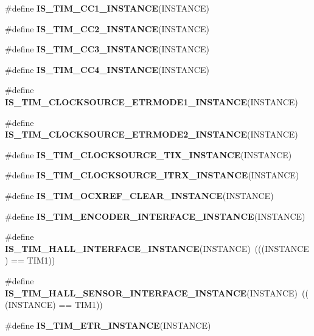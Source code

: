 \begin{DoxyCompactItemize}
\#define {\bfseries I\+S\+\_\+\+T\+I\+M\+\_\+\+C\+C1\+\_\+\+I\+N\+S\+T\+A\+N\+CE}(I\+N\+S\+T\+A\+N\+CE)
\item 
\#define {\bfseries I\+S\+\_\+\+T\+I\+M\+\_\+\+C\+C2\+\_\+\+I\+N\+S\+T\+A\+N\+CE}(I\+N\+S\+T\+A\+N\+CE)
\item 
\#define {\bfseries I\+S\+\_\+\+T\+I\+M\+\_\+\+C\+C3\+\_\+\+I\+N\+S\+T\+A\+N\+CE}(I\+N\+S\+T\+A\+N\+CE)
\item 
\#define {\bfseries I\+S\+\_\+\+T\+I\+M\+\_\+\+C\+C4\+\_\+\+I\+N\+S\+T\+A\+N\+CE}(I\+N\+S\+T\+A\+N\+CE)
\item 
\#define {\bfseries I\+S\+\_\+\+T\+I\+M\+\_\+\+C\+L\+O\+C\+K\+S\+O\+U\+R\+C\+E\+\_\+\+E\+T\+R\+M\+O\+D\+E1\+\_\+\+I\+N\+S\+T\+A\+N\+CE}(I\+N\+S\+T\+A\+N\+CE)
\item 
\#define {\bfseries I\+S\+\_\+\+T\+I\+M\+\_\+\+C\+L\+O\+C\+K\+S\+O\+U\+R\+C\+E\+\_\+\+E\+T\+R\+M\+O\+D\+E2\+\_\+\+I\+N\+S\+T\+A\+N\+CE}(I\+N\+S\+T\+A\+N\+CE)
\item 
\#define {\bfseries I\+S\+\_\+\+T\+I\+M\+\_\+\+C\+L\+O\+C\+K\+S\+O\+U\+R\+C\+E\+\_\+\+T\+I\+X\+\_\+\+I\+N\+S\+T\+A\+N\+CE}(I\+N\+S\+T\+A\+N\+CE)
\item 
\#define {\bfseries I\+S\+\_\+\+T\+I\+M\+\_\+\+C\+L\+O\+C\+K\+S\+O\+U\+R\+C\+E\+\_\+\+I\+T\+R\+X\+\_\+\+I\+N\+S\+T\+A\+N\+CE}(I\+N\+S\+T\+A\+N\+CE)
\item 
\#define {\bfseries I\+S\+\_\+\+T\+I\+M\+\_\+\+O\+C\+X\+R\+E\+F\+\_\+\+C\+L\+E\+A\+R\+\_\+\+I\+N\+S\+T\+A\+N\+CE}(I\+N\+S\+T\+A\+N\+CE)
\item 
\#define {\bfseries I\+S\+\_\+\+T\+I\+M\+\_\+\+E\+N\+C\+O\+D\+E\+R\+\_\+\+I\+N\+T\+E\+R\+F\+A\+C\+E\+\_\+\+I\+N\+S\+T\+A\+N\+CE}(I\+N\+S\+T\+A\+N\+CE)
\item 
\mbox{\label{group___exported__macro_gacdcc047699e2d83c9d2b3a3f8375dff4}} 
\#define {\bfseries I\+S\+\_\+\+T\+I\+M\+\_\+\+H\+A\+L\+L\+\_\+\+I\+N\+T\+E\+R\+F\+A\+C\+E\+\_\+\+I\+N\+S\+T\+A\+N\+CE}(I\+N\+S\+T\+A\+N\+CE)~(((I\+N\+S\+T\+A\+N\+CE) == T\+I\+M1))
\item 
\mbox{\label{group___exported__macro_ga979ea18ba0931f5ed15cc2f3ac84794b}} 
\#define {\bfseries I\+S\+\_\+\+T\+I\+M\+\_\+\+H\+A\+L\+L\+\_\+\+S\+E\+N\+S\+O\+R\+\_\+\+I\+N\+T\+E\+R\+F\+A\+C\+E\+\_\+\+I\+N\+S\+T\+A\+N\+CE}(I\+N\+S\+T\+A\+N\+CE)~(((I\+N\+S\+T\+A\+N\+CE) == T\+I\+M1))
\item 
\#define {\bfseries I\+S\+\_\+\+T\+I\+M\+\_\+\+E\+T\+R\+\_\+\+I\+N\+S\+T\+A\+N\+CE}(I\+N\+S\+T\+A\+N\+CE)

\end{DoxyCompactItemize}
